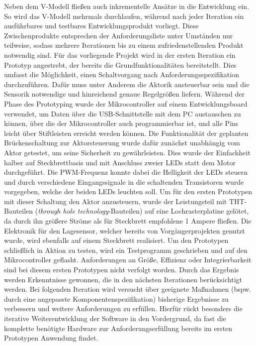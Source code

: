 Neben dem V-Modell fließen auch inkrementelle Ansätze in die Entwicklung ein. So wird das V-Modell mehrmals durchlaufen, während nach jeder Iteration ein ausführbares und testbares Entwicklungsprodukt vorliegt. Diese Zwischenprodukte entsprechen der Anforderungsliste unter Umständen nur teilweise, sodass mehrere Iterationen bis zu einem zufriedenstellenden Produkt notwendig sind. Für das vorliegende Projekt wird in der ersten Iteration ein Prototyp angestrebt, der bereits die Grundfunktionalitäten bereitstellt. Dies umfasst die Möglichkeit, einen Schaltvorgang nach Anforderungsspezifikation durchzuführen. Dafür muss unter Anderem die Aktorik ansteuerbar sein und die Sensorik notwendige und hinreichend genaue Regelgrößen liefern. 
Während der Phase des Prototyping wurde der Mikrocontroller auf einem Entwicklungsboard verwendet, um Daten über die USB-Schnittstelle mit dem PC austauschen zu können, über die der Mikrocontroller auch programmierbar ist, und alle Pins leicht über Stiftleisten erreicht werden können. Die Funktionalität der geplanten Brückenschaltung zur Aktorsteuerung wurde dafür zunächst unabhängig vom Aktor getestet, um seine Sicherheit zu gewährleisten. Dies wurde der Einfachheit halber auf Steckbrettbasis und mit Anschluss zweier LEDs statt dem Motor durchgeführt. Die PWM-Frequenz konnte dabei die Helligkeit der LEDs steuern und durch verschiedene Eingangssignale in die schaltenden Transistoren wurde vorgegeben, welche der beiden LEDs leuchten soll. Um für den ersten Prototypen mit dieser Schaltung den Aktor anzusteuern, wurde der Leistungsteil mit THT-Bauteilen (\textit{through hole technology}-Bauteilen) auf eine Lochrasterplatine gelötet, da durch ihn größere Ströme als für Steckbrett empfohlene 1 Ampere fließen.
Die Elektronik für den Lagesensor, welcher bereits von Vorgängerprojekten genutzt wurde, wird ebenfalls auf einem Steckbrett realisiert. Um den Prototypen schließlich in Aktion zu testen, wird ein Testprogramm geschrieben und auf den Mikrocontroller geflasht. Anforderungen an Größe, Effizienz oder Integrierbarkeit sind bei diesem ersten Prototypen nicht verfolgt worden. Durch das Ergebnis werden Erkenntnisse gewonnen, die in den nächsten Iterationen berücksichtigt werden. 
Bei folgenden Iteration wird versucht über geeignete Maßnahmen (bspw. durch eine angepasste Komponentenspezifikation) bisherige Ergebnisse zu verbessern und weitere Anforderungen zu erfüllen. 
Hierfür rückt besonders die iterative Weiterentwicklung der Software in den Vordergrund, da fast die komplette benötigte Hardware zur Anforderungserfüllung bereits im ersten Prototypen Anwendung findet. %
